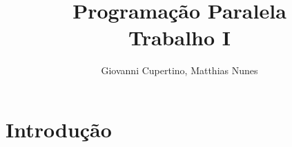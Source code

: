 \documentclass[9pt]{IEEEtran}
\title{Programação Paralela\\ Trabalho I}
\author{Giovanni Cupertino, Matthias Nunes}
\begin{document}
\maketitle

\section{Introdução}
\end{document}
